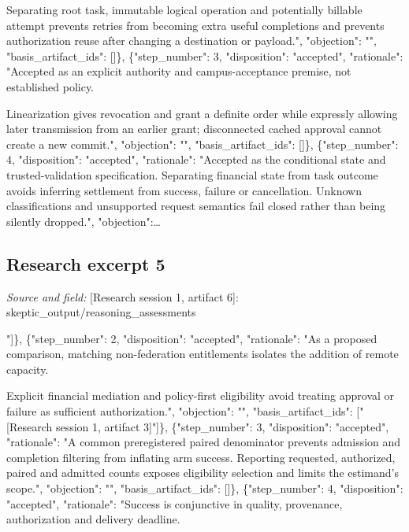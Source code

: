 \documentclass[11pt]{article}
\begin{document}
Separating root task, immutable logical operation and potentially billable attempt prevents retries from becoming extra useful completions and prevents authorization reuse after changing a destination or payload.", "objection": "", "basis\_artifact\_ids": []\}, \{"step\_number": 3, "disposition": "accepted", "rationale": "Accepted as an explicit authority and campus-acceptance premise, not established policy.

Linearization gives revocation and grant a definite order while expressly allowing later transmission from an earlier grant; disconnected cached approval cannot create a new commit.", "objection": "", "basis\_artifact\_ids": []\}, \{"step\_number": 4, "disposition": "accepted", "rationale": "Accepted as the conditional state and trusted-validation specification. Separating financial state from task outcome avoids inferring settlement from success, failure or cancellation. Unknown classifications and unsupported request semantics fail closed rather than being silently dropped.", "objection":\ldots{}

\subsection{Research excerpt 5}
\textit{Source and field: }[Research session 1, artifact 6]: skeptic\_output/reasoning\_assessments\par
[\{"step\_number": 1, "disposition": "accepted", "rationale": "The supplied cycle-1 extract contains the stated reservation and scheduling examples. The current proposal explicitly tightens, rather than retrospectively reinterprets, the earlier federation gate and preserves its open requirements.", "objection": "", "basis\_artifact\_ids": ["[Research session 1, artifact 3]"]\}, \{"step\_number": 2, "disposition": "accepted", "rationale": "As a proposed comparison, matching non-federation entitlements isolates the addition of remote capacity.

Explicit financial mediation and policy-first eligibility avoid treating approval or failure as sufficient authorization.", "objection": "", "basis\_artifact\_ids": ["[Research session 1, artifact 3]"]\}, \{"step\_number": 3, "disposition": "accepted", "rationale": "A common preregistered paired denominator prevents admission and completion filtering from inflating arm success. Reporting requested, authorized, paired and admitted counts exposes eligibility selection and limits the estimand's scope.", "objection": "", "basis\_artifact\_ids": []\}, \{"step\_number": 4, "disposition": "accepted", "rationale": "Success is conjunctive in quality, provenance, authorization and delivery deadline.
\end{document}
